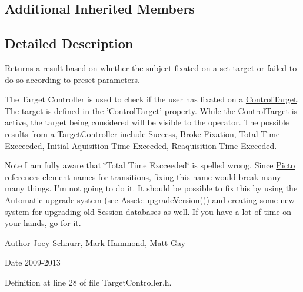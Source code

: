 \subsection*{Additional Inherited Members}


\subsection{Detailed Description}
Returns a result based on whether the subject fixated on a set target or failed to do so according to preset parameters. 

The Target Controller is used to check if the user has fixated on a \hyperlink{class_picto_1_1_control_target}{Control\-Target}. The target is defined in the '\hyperlink{class_picto_1_1_control_target}{Control\-Target}' property. While the \hyperlink{class_picto_1_1_control_target}{Control\-Target} is active, the target being considered will be visible to the operator. The possible results from a \hyperlink{class_picto_1_1_target_controller}{Target\-Controller} include Success, Broke Fixation, Total Time Excceeded, Initial Aquisition Time Exceeded, Reaquisition Time Exceeded. \begin{DoxyNote}{Note}
I am fully aware that \char`\"{}\-Total Time Excceeded\char`\"{} is spelled wrong. Since \hyperlink{namespace_picto}{Picto} references element names for transitions, fixing this name would break many many things. I'm not going to do it. It should be possible to fix this by using the Automatic upgrade system (see \hyperlink{class_picto_1_1_asset_aacaaedf9d76c3af2c7168d5c14fed914}{Asset\-::upgrade\-Version()}) and creating some new system for upgrading old Session databases as well. If you have a lot of time on your hands, go for it. 
\end{DoxyNote}
\begin{DoxyAuthor}{Author}
Joey Schnurr, Mark Hammond, Matt Gay 
\end{DoxyAuthor}
\begin{DoxyDate}{Date}
2009-\/2013 
\end{DoxyDate}


Definition at line 28 of file Target\-Controller.\-h.



